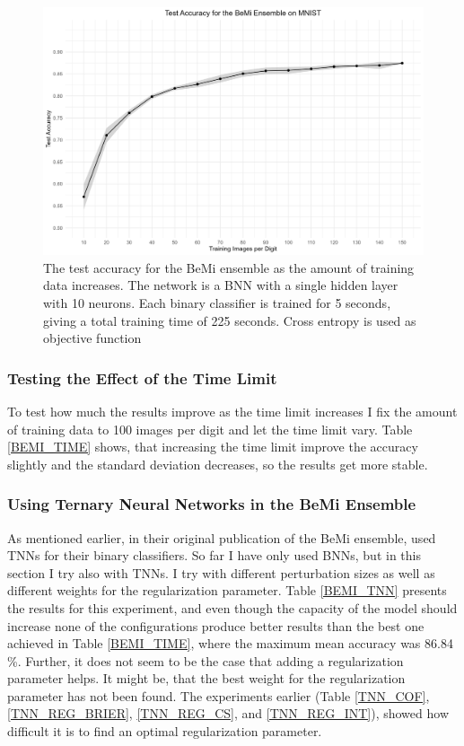 \begin{figure}[H]
    \centering
    \includegraphics[width=1\linewidth]{Figures/BEMI_BS.png}
    \caption{The test accuracy for the BeMi ensemble as the amount of training data increases. The network is a BNN with a single hidden layer with 10 neurons.
    Each binary classifier is trained for 5 seconds, giving a total training time of 225 seconds. Cross entropy is used as objective function}
    \label{BEMI_BS}
\end{figure}

\subsubsection{Testing the Effect of the Time Limit}
To test how much the results improve as the time limit increases I fix the amount of training data to 100 images per digit and let the time limit vary. Table \ref{BEMI_TIME} shows, that increasing the time limit improve the accuracy slightly and the standard deviation decreases, so the results get more stable. 



\subsubsection{Using Ternary Neural Networks in the BeMi Ensemble}
As mentioned earlier, in their original publication of the BeMi ensemble, \cite{ambrogio2023} used TNNs for their binary classifiers. So far I have only used BNNs, but in this section I try also with TNNs. I try with different perturbation sizes as well as different weights for the regularization parameter. Table \ref{BEMI_TNN} presents the results for this experiment, and even though the capacity of the model should increase none of the configurations produce better results than the best one achieved in Table \ref{BEMI_TIME}, where the maximum mean accuracy was 86.84 \%. Further, it does not seem to be the case that adding a regularization parameter helps. It might be, that the best weight for the regularization parameter has not been found. The experiments earlier (Table \ref{TNN_COF}, \ref{TNN_REG_BRIER}, \ref{TNN_REG_CS}, and \ref{TNN_REG_INT}), showed how difficult it is to find an optimal regularization parameter. 

